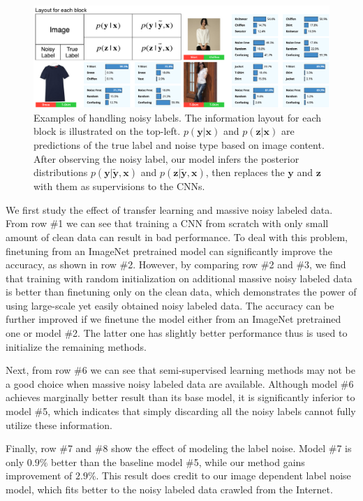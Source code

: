 \documentclass[10pt,twocolumn,letterpaper]{article}
\def\vec{\mathbf}
\begin{document}
\begin{figure}
\begin{center}
\includegraphics[width=0.95\linewidth]{figure/model_output.pdf}
\caption{Examples of handling noisy labels. The information layout for each block is illustrated on the top-left. $p(\vec{y}|\vec{x})$ and $p(\vec{z}|\vec{x})$ are predictions of the true label and noise type based on image content. After observing the noisy label, our model infers the posterior distributions $p(\vec{y}|\vec{\tilde{y}},\vec{x})$ and $p(\vec{z}|\vec{\tilde{y}},\vec{x})$, then replaces the $\vec{y}$ and $\vec{z}$ with them as supervisions to the CNNs.}
\label{fig:model_output}
\end{center}
\end{figure}

We first study the effect of transfer learning and massive noisy labeled data. From row \#1 we can see that training a CNN from scratch with only small amount of clean data can result in bad performance. To deal with this problem, finetuning from an ImageNet pretrained model can significantly improve the accuracy, as shown in row \#2. However, by comparing row \#2 and \#3, we find that training with random initialization on additional massive noisy labeled data is better than finetuning only on the clean data, which demonstrates the power of using large-scale yet easily obtained noisy labeled data. The accuracy can be further improved if we finetune the model either from an ImageNet pretrained one or model \#2. The latter one has slightly better performance thus is used to initialize the remaining methods.

Next, from row \#6 we can see that semi-supervised learning methods may not be a good choice when massive noisy labeled data are available. Although model \#6 achieves marginally better result than its base model, it is significantly inferior to model \#5, which indicates that simply discarding all the noisy labels cannot fully utilize these information.

Finally, row \#7 and \#8 show the effect of modeling the label noise. Model \#7 is only $0.9\%$ better than the baseline model \#5, while our method gains improvement of $2.9\%$. This result does credit to our image dependent label noise model, which fits better to the noisy labeled data crawled from the Internet.
\end{document}
